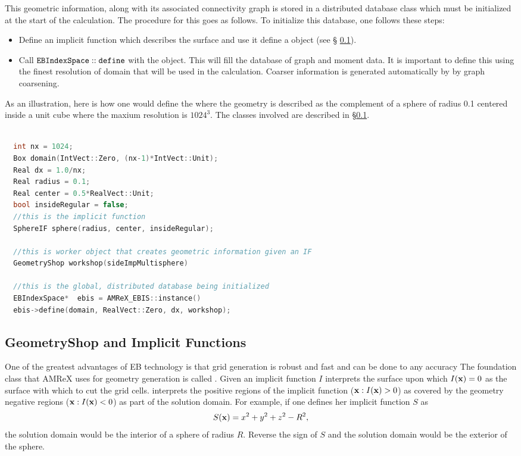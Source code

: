 This geometric information, along with its associated connectivity
graph is stored in a distributed database class \ebis which must be
initialized at the start of the calculation.    The procedure for this
goes as follows.   To initialize this database, one follows these steps:
\begin{itemize}
\item Define an implicit function which describes the surface 
      and use it define a \geom object (see \S
      \ref{sec:EB:geometryshop}).
\item Call $\tt{EBIndexSpace::define}$ with the \geom object.   This
  will fill the database of graph and moment data.   It is important
  to define this using the finest resolution of domain that will be
  used in the calculation.   Coarser information is generated
  automatically by \ebis by graph coarsening.
\end{itemize}
As an illustration, here is how one would define the \ebis where the
geometry is described as the complement of a sphere of radius 0.1
centered inside a unit cube where the maxium resolution is $1024^3$.
The classes involved are described in \S \ref{sec:EB:geometryshop}.

\begin{lstlisting}[language=cpp]

  int nx = 1024;
  Box domain(IntVect::Zero, (nx-1)*IntVect::Unit);
  Real dx = 1.0/nx;
  Real radius = 0.1;
  Real center = 0.5*RealVect::Unit;
  bool insideRegular = false;
  //this is the implicit function
  SphereIF sphere(radius, center, insideRegular);

  //this is worker object that creates geometric information given an IF
  GeometryShop workshop(sideImpMultisphere)

  //this is the global, distributed database being initialized
  EBIndexSpace*  ebis = AMReX_EBIS::instance()
  ebis->define(domain, RealVect::Zero, dx, workshop);

\end{lstlisting}


\subsection{GeometryShop and Implicit Functions}
\label{sec:EB:geometryshop}

One of the greatest advantages of EB technology is that grid
generation is robust and fast and can be done to any accuracy
The foundation class that AMReX uses for
geometry generation is called \geom.  Given an implicit
function $I$  \geom interprets the surface upon which $I({\bf x}) = 0$
as the surface with which to cut the grid cells.   \geom interprets
the positive regions of the implicit function (${\bf x}: I({\bf x}) > 0$)
as covered by the geometry  negative regions (${\bf x}: I({\bf x}) < 0$) 
as part of  the solution domain.  For example, if one defines her
implicit function $S$ as
$$
S({\bf x}) = x^2 + y^2 + z^2 - R^2,
$$
the solution domain would be the interior of a sphere of radius $R$.
Reverse the sign of $S$ and the solution domain would be the exterior
of the sphere.   


